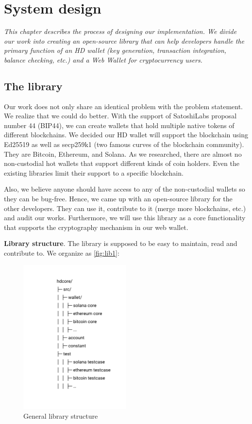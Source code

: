 \chapter{System design} \label{chap:System_desgin}
\textit{This chapter describes the process of designing our implementation. We divide our work into creating an open-source library that can help developers handle the primary function of an HD wallet (key generation, transaction integration, balance checking, etc.) and a Web Wallet for cryptocurrency users. }

\minitoc

\section{The library}
Our work does not only share an identical problem with the problem statement. We realize that we could do better. With the support of SatoshiLabs proposal number 44 (BIP44), we can create wallets that hold multiple native tokens of different blockchains. We decided our HD wallet will support the blockchain using Ed25519 as well as secp259k1 (two famous curves of the blockchain community). They are Bitcoin, Ethereum, and Solana. As we researched, there are almost no non-custodial hot wallets that support different kinds of coin holders. Even the existing libraries limit their support to a specific blockchain.

Also, we believe anyone should have access to any of the non-custodial wallets so they can be bug-free. Hence, we came up with an open-source library for the other developers. They can use it, contribute to it (merge more blockchains, etc.) and audit our works. Furthermore, we will use this library as a core functionality that supports the cryptography mechanism in our web wallet.

\bigskip
{\textbf{Library structure}}. The library is supposed to be easy to maintain, read and contribute to. We organize as \autoref{fig:lib1}:

\begin{figure}[!ht]
    \centering
    \includegraphics[width=0.5\textwidth]{images/lib_struct.png}
    \caption[General library structure]{General library structure}
    \label{fig:lib1}
\end{figure}

